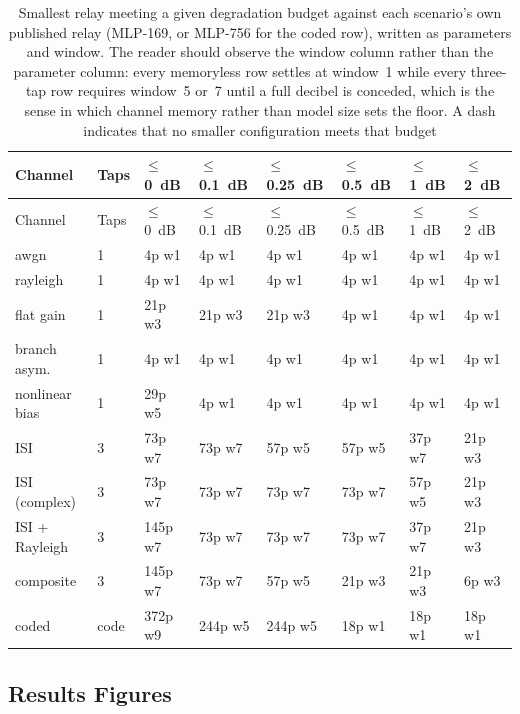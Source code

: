 \begin{longtable}[]{@{}llllllll@{}}
\caption[Smallest relay per degradation budget]{Smallest relay meeting a given degradation budget against each scenario's own published relay (MLP-169, or MLP-756 for the coded row), written as parameters and window. The reader should observe the window column rather than the parameter column: every memoryless row settles at window~1 while every three-tap row requires window~5 or~7 until a full decibel is conceded, which is the sense in which channel memory rather than model size sets the floor. A dash indicates that no smaller configuration meets that budget}\label{tbl:table-minsize}\tabularnewline
\toprule\noalign{}
Channel & Taps & $\le$0~dB & $\le$0.1~dB & $\le$0.25~dB & $\le$0.5~dB & $\le$1~dB & $\le$2~dB \\
\midrule\noalign{}
\endfirsthead
\toprule\noalign{}
Channel & Taps & $\le$0~dB & $\le$0.1~dB & $\le$0.25~dB & $\le$0.5~dB & $\le$1~dB & $\le$2~dB \\
\midrule\noalign{}
\endhead
\bottomrule\noalign{}
\endlastfoot
awgn & 1 & 4p w1 & 4p w1 & 4p w1 & 4p w1 & 4p w1 & 4p w1 \\
rayleigh & 1 & 4p w1 & 4p w1 & 4p w1 & 4p w1 & 4p w1 & 4p w1 \\
flat gain & 1 & 21p w3 & 21p w3 & 21p w3 & 4p w1 & 4p w1 & 4p w1 \\
branch asym. & 1 & 4p w1 & 4p w1 & 4p w1 & 4p w1 & 4p w1 & 4p w1 \\
nonlinear bias & 1 & 29p w5 & 4p w1 & 4p w1 & 4p w1 & 4p w1 & 4p w1 \\
ISI & 3 & 73p w7 & 73p w7 & 57p w5 & 57p w5 & 37p w7 & 21p w3 \\
ISI (complex) & 3 & 73p w7 & 73p w7 & 73p w7 & 73p w7 & 57p w5 & 21p w3 \\
ISI + Rayleigh & 3 & 145p w7 & 73p w7 & 73p w7 & 73p w7 & 37p w7 & 21p w3 \\
composite & 3 & 145p w7 & 73p w7 & 57p w5 & 21p w3 & 21p w3 & 6p w3 \\
coded & code & 372p w9 & 244p w5 & 244p w5 & 18p w1 & 18p w1 & 18p w1 \\
\end{longtable}

\subsection{Results Figures}\label{sec:results-figures-minsize}

